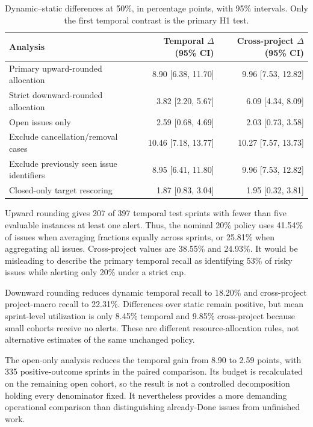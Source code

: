\documentclass[11pt,a4paper]{article}
\begin{document}
{\def\LTcaptype{table}
\begin{table}[htbp]
\centering\footnotesize\setlength{\tabcolsep}{4pt}
\caption{Dynamic--static differences at 50\%, in percentage points, with 95\% intervals. Only the first temporal contrast is the primary H1 test.}\label{tab:03_sensitivity}
\begin{tabular}{@{}lrr@{}}
\toprule
Analysis & \shortstack{Temporal $\Delta$\\(95\% CI)} & \shortstack{Cross-project $\Delta$\\(95\% CI)} \\
\midrule
Primary upward-rounded allocation & 8.90 {[}6.38, 11.70{]} & 9.96 {[}7.53, 12.82{]} \\
Strict downward-rounded allocation & 3.82 {[}2.20, 5.67{]} & 6.09 {[}4.34, 8.09{]} \\
Open issues only & 2.59 {[}0.68, 4.69{]} & 2.03 {[}0.73, 3.58{]} \\
Exclude cancellation/removal cases & 10.46 {[}7.18, 13.77{]} & 10.27 {[}7.57, 13.73{]} \\
Exclude previously seen issue identifiers & 8.95 {[}6.41, 11.80{]} & 9.96 {[}7.53, 12.82{]} \\
Closed-only target rescoring & 1.87 {[}0.83, 3.04{]} & 1.95 {[}0.32, 3.81{]} \\
\bottomrule
\end{tabular}
\end{table}

}

Upward rounding gives 207 of 397 temporal test sprints with fewer than five evaluable instances at least one alert. Thus, the nominal 20\% policy uses 41.54\% of issues when averaging fractions equally across sprints, or 25.81\% when aggregating all issues. Cross-project values are 38.55\% and 24.93\%. It would be misleading to describe the primary temporal recall as identifying 53\% of risky issues while alerting only 20\% under a strict cap.

Downward rounding reduces dynamic temporal recall to 18.20\% and cross-project project-macro recall to 22.31\%. Differences over static remain positive, but mean sprint-level utilization is only 8.45\% temporal and 9.85\% cross-project because small cohorts receive no alerts. These are different resource-allocation rules, not alternative estimates of the same unchanged policy.

The open-only analysis reduces the temporal gain from 8.90 to 2.59 points, with 335 positive-outcome sprints in the paired comparison. Its budget is recalculated on the remaining open cohort, so the result is not a controlled decomposition holding every denominator fixed. It nevertheless provides a more demanding operational comparison than distinguishing already-Done issues from unfinished work.
\end{document}

